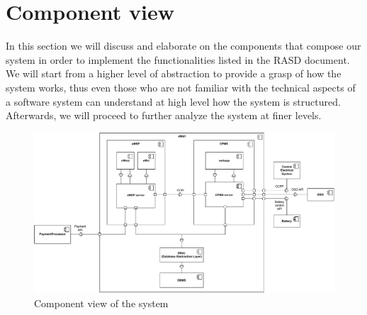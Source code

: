 \section{Component view}
\label{sec:component_view}
In this section we will discuss and elaborate on the components that compose our system in order to implement the functionalities listed in the RASD document. We will start from a higher level of abstraction to provide a grasp of how the system works, thus even those who are not familiar with the technical aspects of a software system can understand at high level how the system is structured. Afterwards, we will proceed to further analyze the system at finer levels.
\begin{figure}[H]
    \centering
    \includegraphics[width=1\textwidth]{Images/cp2/component_overview.pdf}
    \caption{Component view of the system}
\end{figure}

